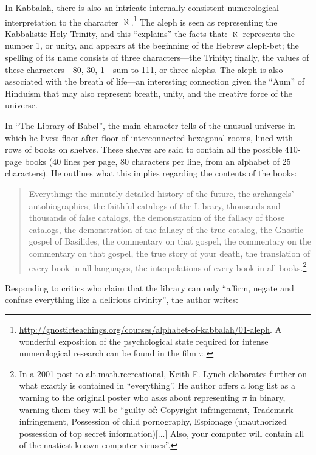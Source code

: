 \documentclass{thesis}
\begin{document}
	In Kabbalah, there is also an intricate internally consistent numerological interpretation to the character $\aleph$.\footnote{\url{http://gnosticteachings.org/courses/alphabet-of-kabbalah/01-aleph}. A wonderful exposition of the psychological state required for intense numerological research can be found in the film $\pi$.} The aleph is seen as representing the Kabbalistic Holy Trinity, and this ``explains'' the facts that: $\aleph$ represents the number 1, or unity, and appears at the beginning of the Hebrew aleph-bet; the spelling of its name consists of three characters---the Trinity; finally, the values of these characters---80, 30, 1---sum to 111, or three alephs. The aleph is also associated with the breath of life---an interesting connection given the ``Aum'' of Hinduism that may also represent breath, unity, and the creative force of the universe.
	
	In ``The Library of Babel'', the main character tells of the unusual universe in which he lives: floor after floor of interconnected hexagonal rooms, lined with rows of books on shelves. These shelves are said to contain all the possible 410-page books (40 lines per page, 80 characters per line, from an alphabet of 25 characters). He outlines what this implies regarding the contents of the books:
	
	\begin{quote}
	Everything: the minutely detailed history of the future, the archangels' autobiographies, the faithful catalogs of the Library, thousands and thousands of false catalogs, the demonstration of the fallacy of those catalogs, the demonstration of the fallacy of the true catalog, the Gnostic gospel of Basilides, the commentary on that gospel, the commentary on the commentary on that gospel, the true story of your death, the translation of every book in all languages, the interpolations of every book in all books.\footnote{In a 2001 post to alt.math.recreational, Keith F. Lynch elaborates further on what exactly is contained in ``everything''.\cite{keith_f._lynch_converting_????} He author offers a long list as a warning to the original poster who asks about representing $\pi$ in binary, warning them they will be ``guilty of: Copyright infringement, Trademark infringement, Possession of child pornography, Espionage (unauthorized possession of top secret information)[...] Also, your computer will contain all of the nastiest known computer viruses''.}
	\end{quote}
	
	Responding to critics who claim that the library can only ``affirm, negate and confuse everything like a delirious divinity'', the author writes:
	
\end{document}
